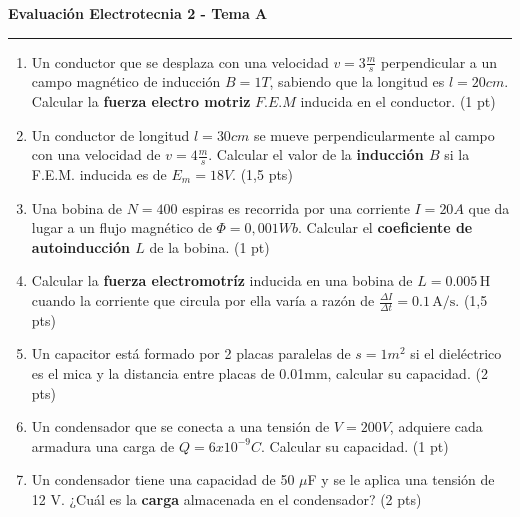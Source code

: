 \documentclass[a4paper,10pt]{article}
\begin{document}
\pagestyle{empty}

\begin{minipage}[t][0.48\textheight][t]{0.48\textwidth}
  \centering \textbf{Evaluación Electrotecnia 2 - Tema A} \\
  \rule{\textwidth}{0.4pt}
  \begin{enumerate}
    \item Un conductor que se desplaza con una velocidad
      $v=3\frac{m}{s}$ perpendicular a un campo magnético de
      inducción $B=1T$, sabiendo que la longitud es $l=20cm$.
      Calcular la \textbf{fuerza electro motriz} $F.E.M$ inducida en
      el conductor. (1 pt)
    \item Un conductor de longitud $l=30cm$ se mueve
      perpendicularmente al campo con una velocidad de
      $v=4\frac{m}{s}$. Calcular el valor de la \textbf{inducción
      $B$} si la F.E.M. inducida es de $E_m=18V$. (1,5 pts)
    \item Una bobina de $N=400$ espiras es recorrida por una
      corriente $I=20A$ que da lugar a un flujo magnético de
      $\Phi=0,001Wb$. Calcular el \textbf{coeficiente de
      autoinducción $L$} de la bobina. (1 pt)
    \item Calcular la \textbf{fuerza electromotríz} inducida en una
      bobina de \( L = 0.005 \, \text{H} \) cuando la corriente que
      circula por ella varía a razón de \( \frac{\Delta I}{\Delta t}
      = 0.1\, \text{A/s} \). (1,5 pts)
    \item Un capacitor está formado por 2 placas paralelas de
      $s=1m^2$ si el dieléctrico es el mica y la distancia entre
      placas de 0.01mm, calcular su capacidad. (2 pts)
    \item Un condensador que se conecta a una tensión de $V=200V$,
      adquiere cada armadura una carga de $Q=6x10^{-9}C$. Calcular su
      capacidad. (1 pt)
    \item Un condensador tiene una capacidad de 50 $\mu$F y se le
      aplica una tensión de 12 V. ¿Cuál es la \textbf{carga}
      almacenada en el condensador? (2 pts)
  \end{enumerate}
\end{minipage}
\hfill
\end{document}

